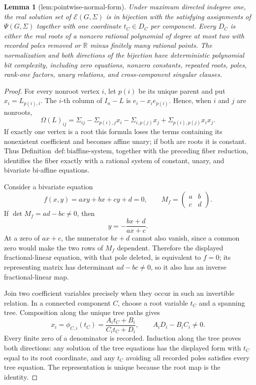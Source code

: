 \documentclass{article}
\newtheorem{lemma}{Lemma}
\begin{document}
\begin{lemma}[lem:pointwise-normal-form]\label{lem:pointwise-normal-form}
Under maximum directed indegree one, the real solution set of \(\mathcal E(G,\Sigma)\) is in bijection with the satisfying assignments of \(\Psi(G,\Sigma)\) together with one coordinate \(t_C\in D_C\) per component. Every \(D_C\) is either the real roots of a nonzero rational polynomial of degree at most two with recorded poles removed or \(\mathbb R\) minus finitely many rational points. The normalization and both directions of the bijection have deterministic polynomial bit complexity, including zero equations, nonzero constants, repeated roots, poles, rank-one factors, unary relations, and cross-component singular clauses.
\end{lemma}
\begin{proof}
For every nonroot vertex \(i\), let \(p(i)\) be its unique parent and put \(x_i=L_{p(i),i}\).  The \(i\)-th column of \(I_n-L\) is \(e_i-x_i e_{p(i)}\).  Hence, when \(i\) and \(j\) are nonroots,
\[
\Omega(L)_{ij}
=\Sigma_{ij}-\Sigma_{p(i),j}x_i-\Sigma_{i,p(j)}x_j
+\Sigma_{p(i),p(j)}x_ix_j.
\]
If exactly one vertex is a root this formula loses the terms containing its nonexistent coefficient and becomes affine unary; if both are roots it is constant.  Thus Definition~\(\mathrm{def:biaffine\mbox{-}system}\), together with the preceding fiber reduction, identifies the fiber exactly with a rational system of constant, unary, and bivariate bi-affine equations.

Consider a bivariate equation
\[
f(x,y)=axy+bx+cy+d=0,
\qquad
M_f=\begin{pmatrix}a&b\\c&d\end{pmatrix}.
\]
If \(\det M_f=ad-bc\ne0\), then
\[
y=-\frac{bx+d}{ax+c}.
\]
At a zero of \(ax+c\), the numerator \(bx+d\) cannot also vanish, since a common zero would make the two rows of \(M_f\) dependent.  Therefore the displayed fractional-linear equation, with that pole deleted, is equivalent to \(f=0\); its representing matrix has determinant \(ad-bc\ne0\), so it also has an inverse fractional-linear map.

Join two coefficient variables precisely when they occur in such an invertible relation.  In a connected component \(C\), choose a root variable \(t_C\) and a spanning tree.  Composition along the unique tree paths gives
\[
x_i=\phi_{C,i}(t_C)=\frac{A_i t_C+B_i}{C_i t_C+D_i},
\qquad A_iD_i-B_iC_i\ne0.
\]
Every finite zero of a denominator is recorded.  Induction along the tree proves both directions: any solution of the tree equations has the displayed form with \(t_C\) equal to its root coordinate, and any \(t_C\) avoiding all recorded poles satisfies every tree equation.  The representation is unique because the root map is the identity.


\end{proof}
\end{document}
